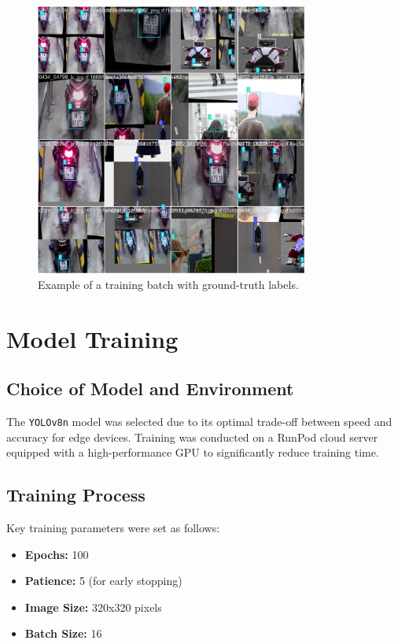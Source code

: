 \begin{figure}[H]
    \centering
    \includegraphics[width=0.8\textwidth]{../runs/detect/helmet_detection/train_batch0.jpg}
    \caption{Example of a training batch with ground-truth labels.}
    \label{fig:training_batch}
\end{figure}

\section{Model Training}
\subsection{Choice of Model and Environment}
The \texttt{YOLOv8n} model was selected due to its optimal trade-off between speed and accuracy for edge devices. Training was conducted on a RunPod cloud server equipped with a high-performance GPU to significantly reduce training time.

\subsection{Training Process}
Key training parameters were set as follows:
\begin{itemize}
    \item \textbf{Epochs:} 100
    \item \textbf{Patience:} 5 (for early stopping)
    \item \textbf{Image Size:} 320x320 pixels
    \item \textbf{Batch Size:} 16
\end{itemize}

